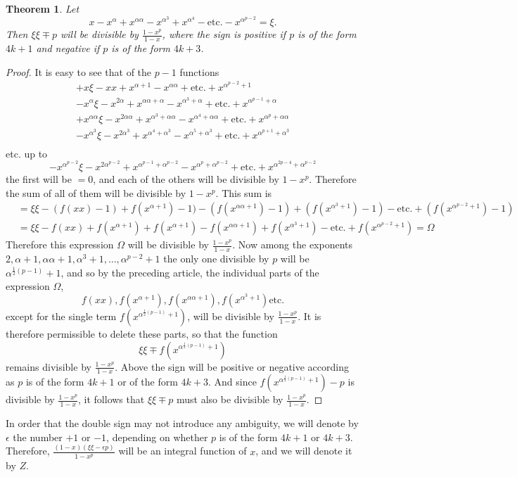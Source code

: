 \documentclass{book}
\theoremstyle{plain}
\newtheorem*{theorem}{Theorem}
\theoremstyle{remark}
\begin{document}
\begin{theorem} Let 
\[ x - x^{\alpha} + x^{\alpha\alpha} - x^{\alpha^3} + x^{\alpha^4} - \textrm{etc.} - x^{\alpha^{p-2}} = \xi .  \]
Then $\xi \xi \mp p$ will be divisible by $\frac{1-x^p}{1-x}$, where the sign is positive if $p$ is of the form $4k+1$ and negative if $p$ is of the form $4k+3$. 
\end{theorem}
\begin{proof} It is easy to see that of the $p-1$ functions
\begin{align*} 
+x\xi -xx + x^{\alpha+1}-x^{\alpha\alpha} + \textrm{etc.}+x^{\alpha^{p-2}+1}  \\
-x^\alpha \xi - x^{2\alpha} + x^{\alpha \alpha+\alpha} - x^{\alpha^3+\alpha}+\textrm{etc.} + x^{\alpha^{p-1}+\alpha} \\
+x^{\alpha\alpha}\xi - x^{2\alpha\alpha} + x^{\alpha^3+\alpha\alpha} - x^{\alpha^4+\alpha\alpha} + \textrm{etc.}+x^{\alpha^p+\alpha\alpha} \\
- x^{\alpha^3} \xi - x^{2\alpha^3} + x^{\alpha^4+\alpha^3} - x^{\alpha^5+\alpha^3} + \textrm{etc.} + x^{\alpha^{p+1} + \alpha^3} \\
\end{align*}
etc. up to
\[ -x^{\alpha^{p-2}}\xi - x^{2\alpha^{p-2}}+x^{\alpha^{p-1}+\alpha^{p-2}}-x^{\alpha^p + \alpha^{p-2}} + \textrm{etc.} + x^{\alpha^{2p-4}+\alpha^{p-2}} \]
the first will be $=0$, and each of the others will be divisible by $1-x^p$.  Therefore the sum of all of them will be divisible by $1-x^p$.  This sum is
\begin{align*}
&=\xi \xi - (f(xx)-1) + f(x^{\alpha+1})-1) - (f(x^{\alpha \alpha+1})-1) + (f(x^{\alpha^3+1})-1) - \textrm{etc.} + (f(x^{\alpha^{p-2}+1})-1) \\
&=\xi \xi - f(xx) + f(x^{\alpha+1}) + f(x^{\alpha+1}) - f(x^{\alpha\alpha+1}) + f(x^{\alpha^3+1}) - \textrm{etc.} + f(x^{\alpha^{p-2}+1}) = \Omega 
\end{align*}
Therefore this expression $\Omega$ will be divisible by $\frac{1-x^p}{1-x}$.  Now among the exponents $2, \alpha+1, \alpha\alpha+1, \alpha^3+1,\dots, \alpha^{p-2}+1$ the only one divisible by $p$ will be $\alpha^{\frac{1}{2}(p-1)}+1$, and so by the preceding article, the individual parts of the expression $\Omega$,
\[ f(xx) , f(x^{\alpha+1}), f(x^{\alpha\alpha+1}), f(x^{\alpha^3+1}) \textrm{etc.} \]
except for the single term $f(x^{\alpha^{\frac{1}{2}(p-1)}+1})$, will be divisible by $\frac{1-x^p}{1-x}$.  It is therefore permissible to delete these parts, so that the function 
\[ \xi \xi \mp f(x^{\alpha^{\frac{1}{2}(p-1)}+1}) \]
remains divisible by $\frac{1-x^p}{1-x}$.  Above the sign will be positive or negative according as $p$ is of the form $4k+1$ or of the form $4k+3$.  And since $f(x^{\alpha^{\frac{1}{2}(p-1)}+1})-p$ is divisible by $\frac{1-x^p}{1-x}$, it follows that $\xi \xi \mp p$ must also be divisible by $\frac{1-x^p}{1-x}$.
\end{proof}
In order that the double sign may not introduce any ambiguity, we will denote by $\epsilon$ the number $+1$ or $-1$, depending on whether $p$ is of the form $4k+1$ or $4k+3$.  Therefore, $\frac{(1-x)(\xi\xi-\epsilon p)}{1-x^p}$ will be an integral function of $x$, and we will denote it by $Z$.
\end{document}
